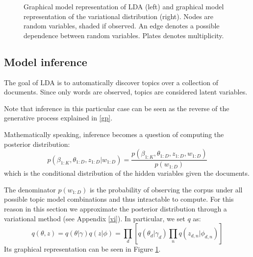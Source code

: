 \begin{figure}[h]
    \centering
    \caption{Graphical model representation of LDA (left) and graphical model representation of the variational distribution (right). Nodes are random variables, shaded if observed. An edge denotes a possible dependence between random variables. Plates denotes multiplicity.}
    \label{fig:lda}
\end{figure}

\subsection{Model inference}
The goal of LDA is to automatically discover topics over a collection of documents.
Since only words are observed, topics are considered latent variables.

Note that inference in this particular case can be seen as the reverse of the generative process explained in \ref{gp}.

Mathematically speaking, inference becomes a question of computing the posterior distribution:
$$ p(\beta_{1:K}, \theta_{1:D}, z_{1:D} | w_{1:D}) = \frac{p(\beta_{1:K}, \theta_{1:D}, z_{1:D}, w_{1:D})}{p(w_{1:D})}$$
which is the conditional distribution of the hidden variables given the documents.

The denominator $p(w_{1:D})$ is the probability of observing the corpus under all possible topic model combinations
and thus intractable to compute.
For this reason in this section we approximate the posterior distribution through a variational method
(see Appendix \ref{vi}).
In particular, we set $q$ as:
$$ q(\theta, z) = q(\theta | \gamma) q(z | \phi) = \prod_d [q(\theta_d | \gamma_d) \prod_n q(z_{d,n} | \phi_{d,n})]$$
Its graphical representation can be seen in Figure \ref{fig:lda}.

